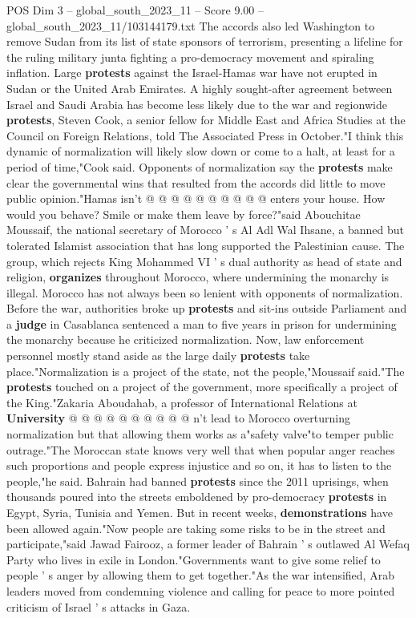 \begin{textsample}{POS Dim 3 – global\_south\_2023\_11 – Score 9.00 – global\_south\_2023\_11/103144179.txt}
The accords also led Washington to remove Sudan from its list of state sponsors of terrorism, presenting a lifeline for the ruling military junta fighting a pro-democracy movement and spiraling inflation.
Large \textbf{protests} against the Israel-Hamas war have not erupted in Sudan or the United Arab Emirates.
A highly sought-after agreement between Israel and Saudi Arabia has become less likely due to the war and regionwide \textbf{protests}, Steven Cook, a senior fellow for Middle East and Africa Studies at the Council on Foreign Relations, told The Associated Press in October."I think this dynamic of normalization will likely slow down or come to a halt, at least for a period of time,"Cook said.
Opponents of normalization say the \textbf{protests} make clear the governmental wins that resulted from the accords did little to move public opinion."Hamas isn't @ @ @ @ @ @ @ @ @ @ enters your house.
How would you behave?
Smile or make them leave by force?"said Abouchitae Moussaif, the national secretary of Morocco ' s Al Adl Wal Ihsane, a banned but tolerated Islamist association that has long supported the Palestinian cause.
The group, which rejects King Mohammed VI ' s dual authority as head of state and religion, \textbf{organizes} throughout Morocco, where undermining the monarchy is illegal.
Morocco has not always been so lenient with opponents of normalization.
Before the war, authorities broke up \textbf{protests} and sit-ins outside Parliament and a \textbf{judge} in Casablanca sentenced a man to five years in prison for undermining the monarchy because he criticized normalization.
Now, law enforcement personnel mostly stand aside as the large daily \textbf{protests} take place."Normalization is a project of the state, not the people,"Moussaif said."The \textbf{protests} touched on a project of the government, more specifically a project of the King."Zakaria Aboudahab, a professor of International Relations at \textbf{University} @ @ @ @ @ @ @ @ @ @ n't lead to Morocco overturning normalization but that allowing them works as a"safety valve"to temper public outrage."The Moroccan state knows very well that when popular anger reaches such proportions and people express injustice and so on, it has to listen to the people,"he said.
Bahrain had banned \textbf{protests} since the 2011 uprisings, when thousands poured into the streets emboldened by pro-democracy \textbf{protests} in Egypt, Syria, Tunisia and Yemen.
But in recent weeks, \textbf{demonstrations} have been allowed again."Now people are taking some risks to be in the street and participate,"said Jawad Fairooz, a former leader of Bahrain ' s outlawed Al Wefaq Party who lives in exile in London."Governments want to give some relief to people ' s anger by allowing them to get together."As the war intensified, Arab leaders moved from condemning violence and calling for peace to more pointed criticism of Israel ' s attacks in Gaza.

\end{textsample}
